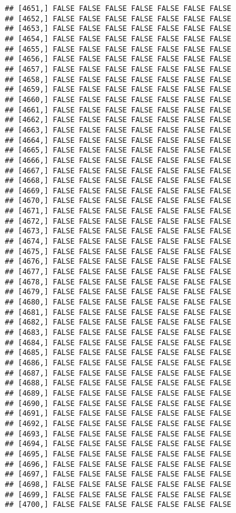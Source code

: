 \documentclass[
]{article}
\begin{document}
\begin{verbatim}
## [4651,] FALSE FALSE FALSE FALSE FALSE FALSE FALSE
## [4652,] FALSE FALSE FALSE FALSE FALSE FALSE FALSE
## [4653,] FALSE FALSE FALSE FALSE FALSE FALSE FALSE
## [4654,] FALSE FALSE FALSE FALSE FALSE FALSE FALSE
## [4655,] FALSE FALSE FALSE FALSE FALSE FALSE FALSE
## [4656,] FALSE FALSE FALSE FALSE FALSE FALSE FALSE
## [4657,] FALSE FALSE FALSE FALSE FALSE FALSE FALSE
## [4658,] FALSE FALSE FALSE FALSE FALSE FALSE FALSE
## [4659,] FALSE FALSE FALSE FALSE FALSE FALSE FALSE
## [4660,] FALSE FALSE FALSE FALSE FALSE FALSE FALSE
## [4661,] FALSE FALSE FALSE FALSE FALSE FALSE FALSE
## [4662,] FALSE FALSE FALSE FALSE FALSE FALSE FALSE
## [4663,] FALSE FALSE FALSE FALSE FALSE FALSE FALSE
## [4664,] FALSE FALSE FALSE FALSE FALSE FALSE FALSE
## [4665,] FALSE FALSE FALSE FALSE FALSE FALSE FALSE
## [4666,] FALSE FALSE FALSE FALSE FALSE FALSE FALSE
## [4667,] FALSE FALSE FALSE FALSE FALSE FALSE FALSE
## [4668,] FALSE FALSE FALSE FALSE FALSE FALSE FALSE
## [4669,] FALSE FALSE FALSE FALSE FALSE FALSE FALSE
## [4670,] FALSE FALSE FALSE FALSE FALSE FALSE FALSE
## [4671,] FALSE FALSE FALSE FALSE FALSE FALSE FALSE
## [4672,] FALSE FALSE FALSE FALSE FALSE FALSE FALSE
## [4673,] FALSE FALSE FALSE FALSE FALSE FALSE FALSE
## [4674,] FALSE FALSE FALSE FALSE FALSE FALSE FALSE
## [4675,] FALSE FALSE FALSE FALSE FALSE FALSE FALSE
## [4676,] FALSE FALSE FALSE FALSE FALSE FALSE FALSE
## [4677,] FALSE FALSE FALSE FALSE FALSE FALSE FALSE
## [4678,] FALSE FALSE FALSE FALSE FALSE FALSE FALSE
## [4679,] FALSE FALSE FALSE FALSE FALSE FALSE FALSE
## [4680,] FALSE FALSE FALSE FALSE FALSE FALSE FALSE
## [4681,] FALSE FALSE FALSE FALSE FALSE FALSE FALSE
## [4682,] FALSE FALSE FALSE FALSE FALSE FALSE FALSE
## [4683,] FALSE FALSE FALSE FALSE FALSE FALSE FALSE
## [4684,] FALSE FALSE FALSE FALSE FALSE FALSE FALSE
## [4685,] FALSE FALSE FALSE FALSE FALSE FALSE FALSE
## [4686,] FALSE FALSE FALSE FALSE FALSE FALSE FALSE
## [4687,] FALSE FALSE FALSE FALSE FALSE FALSE FALSE
## [4688,] FALSE FALSE FALSE FALSE FALSE FALSE FALSE
## [4689,] FALSE FALSE FALSE FALSE FALSE FALSE FALSE
## [4690,] FALSE FALSE FALSE FALSE FALSE FALSE FALSE
## [4691,] FALSE FALSE FALSE FALSE FALSE FALSE FALSE
## [4692,] FALSE FALSE FALSE FALSE FALSE FALSE FALSE
## [4693,] FALSE FALSE FALSE FALSE FALSE FALSE FALSE
## [4694,] FALSE FALSE FALSE FALSE FALSE FALSE FALSE
## [4695,] FALSE FALSE FALSE FALSE FALSE FALSE FALSE
## [4696,] FALSE FALSE FALSE FALSE FALSE FALSE FALSE
## [4697,] FALSE FALSE FALSE FALSE FALSE FALSE FALSE
## [4698,] FALSE FALSE FALSE FALSE FALSE FALSE FALSE
## [4699,] FALSE FALSE FALSE FALSE FALSE FALSE FALSE
## [4700,] FALSE FALSE FALSE FALSE FALSE FALSE FALSE

\end{verbatim}
\end{document}
